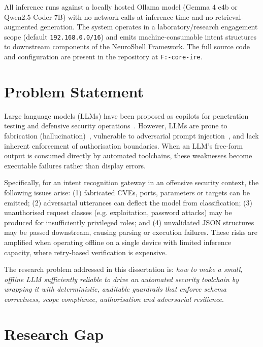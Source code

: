 All inference runs against a locally hosted Ollama model (Gemma 4 e4b or Qwen2.5-Coder 7B) with no network calls at inference time and no retrieval-augmented generation. The system operates in a laboratory/research engagement scope (default \texttt{192.168.0.0/16}) and emits machine-consumable intent structures to downstream components of the NeuroShell Framework. The full source code and configuration are present in the repository at \texttt{F:\neuroshell-core\apps\services\neuroshell-ire}.

\section{Problem Statement}\label{sec:intro-problem}

Large language models (LLMs) have been proposed as copilots for penetration testing and defensive security operations~\cite{deng2024pentestgpt,happe2023pwned}. However, LLMs are prone to fabrication (hallucination)~\cite{ji2023hallucination,farquhar2024semantic}, vulnerable to adversarial prompt injection~\cite{greshake2023indirect,liu2023promptinjection,kang2024dualuse}, and lack inherent enforcement of authorisation boundaries. When an LLM's free-form output is consumed directly by automated toolchains, these weaknesses become executable failures rather than display errors.

Specifically, for an intent recognition gateway in an offensive security context, the following issues arise: (1) fabricated CVEs, ports, parameters or targets can be emitted; (2) adversarial utterances can deflect the model from classification; (3) unauthorised request classes (e.g. exploitation, password attacks) may be produced for insufficiently privileged roles; and (4) unvalidated JSON structures may be passed downstream, causing parsing or execution failures. These risks are amplified when operating offline on a single device with limited inference capacity, where retry-based verification is expensive.

The research problem addressed in this dissertation is: \emph{how to make a small, offline LLM sufficiently reliable to drive an automated security toolchain by wrapping it with deterministic, auditable guardrails that enforce schema correctness, scope compliance, authorisation and adversarial resilience}.

\section{Research Gap}\label{sec:intro-gap}

